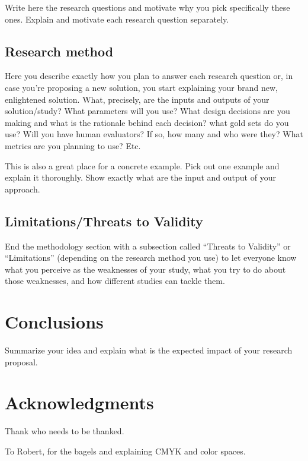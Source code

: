 \documentclass[sigconf,screen]{acmart}
\begin{document}
Write here the research questions and motivate why you pick specifically these ones. Explain and motivate each research question separately.

\subsection{Research method}

Here you describe exactly how you plan to answer each research question or, in case you're proposing a new solution, you start explaining your brand new, enlightened solution. What, precisely, are the inputs and outputs of your solution/study? What parameters will you use? What design decisions are you making and what is the rationale behind each decision? what gold sets do you use? Will you have human evaluators? If so, how many and who were they? What metrics are you planning to use?  Etc.

This is also a great place for a concrete example. Pick out one example and explain it thoroughly. Show exactly what are the input and output of your approach.

\subsection{Limitations/Threats to Validity}

End the methodology section with a subsection called ``Threats to Validity'' or ``Limitations'' (depending on the research method you use) to let everyone know what you perceive as the weaknesses of your study, what you try to do about those weaknesses, and how different studies can tackle them.

\section{Conclusions}
Summarize your idea and explain what is the expected impact of your research proposal.



\section{Acknowledgments}

Thank who needs to be thanked.


\begin{acks}
To Robert, for the bagels and explaining CMYK and color spaces.
\end{acks}
\end{document}
